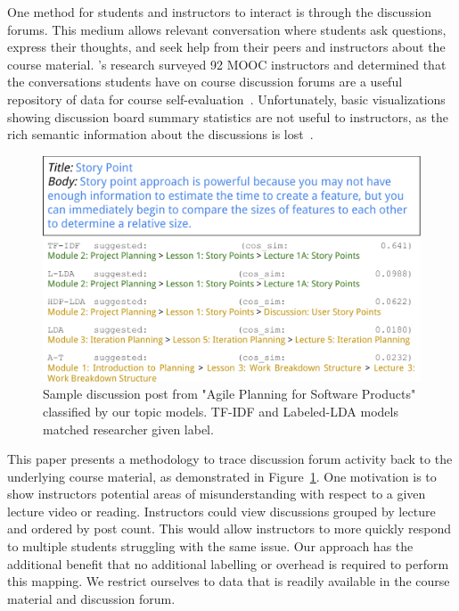 \documentclass[sigconf, nonacm=true]{acmart}
\begin{document}
One method for students and instructors to interact is through the discussion forums.
This medium allows relevant conversation where students ask questions, express their thoughts, and seek help from their peers and instructors about the course material.
\citeauthor{stephens2014monitoring}'s research surveyed 92 MOOC instructors and determined that the conversations students have on course discussion forums are a useful repository of data for course self-evaluation~\cite{stephens2014monitoring}.
Unfortunately, basic visualizations showing discussion board summary statistics are not useful to instructors, as the rich semantic information about the discussions is lost~\cite{stephens2014monitoring}.


\begin{figure}
    \centering
    \includegraphics[width=\columnwidth]{figures/sample_classification}
    \caption{Sample discussion post from "Agile Planning for Software Products" classified by our topic models. TF-IDF and Labeled-LDA models matched researcher given label.}
    \label{fig:sample_classification}
\end{figure}

This paper presents a methodology to trace discussion forum activity back to the underlying course material, as demonstrated in Figure~\ref{fig:sample_classification}.
One motivation is to show instructors potential areas of misunderstanding with respect to a given lecture video or reading.
Instructors could view discussions grouped by lecture and ordered by post count.
This would allow instructors to more quickly respond to multiple students struggling with the same issue.
Our approach has the additional benefit that no additional labelling or overhead is required to perform this mapping.
We restrict ourselves to data that is readily available in the course material and discussion forum.
\end{document}
